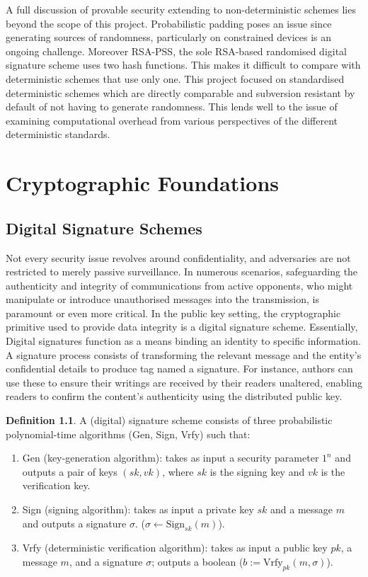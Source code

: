 \documentclass[]{final_report}
\theoremstyle{definition}
\newtheorem{definition}{Definition}[chapter]
\begin{document}
A full discussion of provable security extending to non-deterministic schemes lies beyond the scope of this project. Probabilistic padding poses an issue since generating sources of randomness, particularly on constrained devices is an ongoing challenge. Moreover RSA-PSS, the sole RSA-based randomised digital signature scheme uses two hash functions. This makes it difficult to compare with deterministic schemes that use only one. This project focused on standardised deterministic schemes which are directly comparable and subversion resistant \cite{ateniese2015subversion} by default of not having to generate randomness. This lends well to the issue of examining computational overhead from various perspectives of the different deterministic standards.



\chapter{Cryptographic Foundations}
\section{Digital Signature Schemes}
Not every security issue revolves around confidentiality, and adversaries are not restricted to merely passive surveillance. In numerous scenarios, safeguarding the authenticity and integrity of communications from active opponents, who might manipulate or introduce unauthorised messages into the transmission, is paramount or even more critical. In the public key setting, the cryptographic primitive used to provide data integrity is a digital signature scheme. Essentially, Digital signatures function as a means binding an identity to specific information. A signature process consists of transforming the relevant message and the entity's confidential details to produce tag named a signature. 
For instance, authors can use these to ensure their writings are received by their readers unaltered, enabling readers to confirm the content's authenticity using the distributed public key.


\begin{definition}
\label{def:digital signature}
A (digital) signature scheme consists of three probabilistic polynomial-time algorithms (Gen, Sign, Vrfy) such that:
\begin{enumerate}
    \item Gen (key-generation algorithm): takes as input a security parameter $1^n$ and outputs a pair of keys $(sk ,vk)$, where $sk$ is the signing key and $vk$ is the verification key.
    \item Sign (signing algorithm): takes as input a private key $sk$ and a message $m$ and outputs a signature $\sigma$. ($\sigma \leftarrow \text{Sign}_{sk}(m)$).
    \item Vrfy (deterministic verification algorithm):  takes as input a public key $pk$, a message $m$, and a signature $\sigma$; outputs a boolean ($b := \text{Vrfy}_{pk}(m, \sigma)$).
\end{enumerate}
\end{definition}
\end{document}

